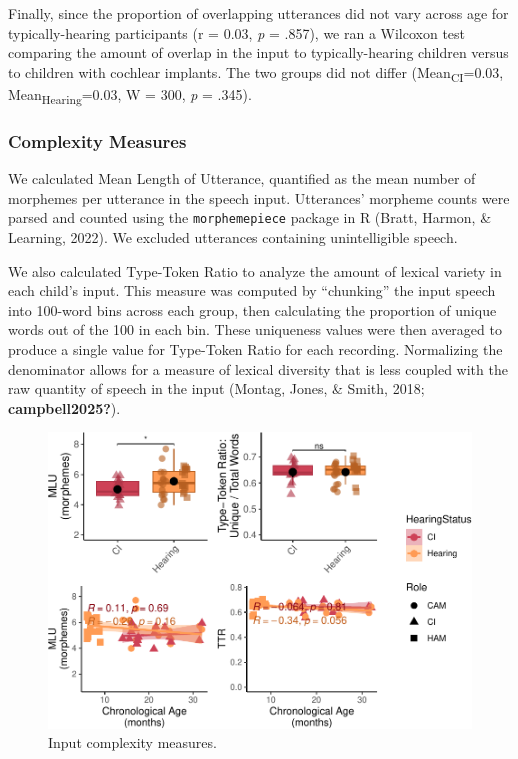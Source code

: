 \documentclass[
  man,floatsintext]{apa6}
\begin{document}
Finally, since the proportion of overlapping utterances did not vary across age for typically-hearing participants (r = 0.03, \emph{p} = .857), we ran a Wilcoxon test comparing the amount of overlap in the input to typically-hearing children versus to children with cochlear implants. The two groups did not differ (Mean\textsubscript{CI}=0.03, Mean\textsubscript{Hearing}=0.03, W = 300, \emph{p} = .345).

\subsubsection{Complexity Measures}\label{complexity-measures}

We calculated Mean Length of Utterance, quantified as the mean number of morphemes per utterance in the speech input. Utterances' morpheme counts were parsed and counted using the \texttt{morphemepiece} package in R (Bratt, Harmon, \& Learning, 2022). We excluded utterances containing unintelligible speech.

We also calculated Type-Token Ratio to analyze the amount of lexical variety in each child's input. This measure was computed by ``chunking'' the input speech into 100-word bins across each group, then calculating the proportion of unique words out of the 100 in each bin. These uniqueness values were then averaged to produce a single value for Type-Token Ratio for each recording. Normalizing the denominator allows for a measure of lexical diversity that is less coupled with the raw quantity of speech in the input (Montag, Jones, \& Smith, 2018; \textbf{campbell2025?}).

\begin{figure}
\centering
\includegraphics{DHH_Input_files/figure-latex/complexity-plot-1.pdf}
\caption{\label{fig:complexity-plot}Input complexity measures.}
\end{figure}
\end{document}
